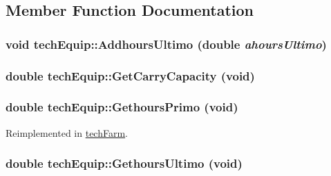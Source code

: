 \subsection{Member Function Documentation}
\hypertarget{classtech_equip_a276361ce65a8d7ceca469528c115b5e0}{
\subsubsection[{AddhoursUltimo}]{\setlength{\rightskip}{0pt plus 5cm}void techEquip::AddhoursUltimo (double {\em ahoursUltimo})}}
\label{classtech_equip_a276361ce65a8d7ceca469528c115b5e0}
\hypertarget{classtech_equip_ae2b82293558dbb80274f62931b8cb49c}{
\subsubsection[{GetCarryCapacity}]{\setlength{\rightskip}{0pt plus 5cm}double techEquip::GetCarryCapacity (void)}}
\label{classtech_equip_ae2b82293558dbb80274f62931b8cb49c}
\hypertarget{classtech_equip_aa1d824dcc6a0b20bf896a4e9a63542ae}{
\subsubsection[{GethoursPrimo}]{\setlength{\rightskip}{0pt plus 5cm}double techEquip::GethoursPrimo (void)}}
\label{classtech_equip_aa1d824dcc6a0b20bf896a4e9a63542ae}


Reimplemented in \hyperlink{classtech_farm_ad61694fe36efc7411dbe4de32452a214}{techFarm}.\hypertarget{classtech_equip_a3b755c4eb6c71bb00b3cf745cd2d3c19}{
\subsubsection[{GethoursUltimo}]{\setlength{\rightskip}{0pt plus 5cm}double techEquip::GethoursUltimo (void)}}
\label{classtech_equip_a3b755c4eb6c71bb00b3cf745cd2d3c19}


